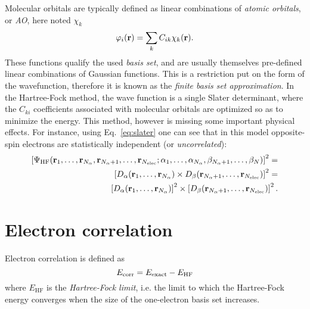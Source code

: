 \documentclass[./thesis.tex]{subfiles}
\begin{document}
Molecular orbitals are typically defined as linear combinations of \emph{atomic orbitals}, or \emph{AO}, here noted $\chi_k$
\begin{equation}
 \varphi_i({\bf r}) = \sum_k C_{ik} \chi_k({\bf r}).
\label{eq:def_mo}
\end{equation}
These functions qualify the used \emph{basis set}, and are usually themselves pre-defined linear combinations of Gaussian functions. This is a restriction put on the form of the wavefunction, therefore it is known as the \emph{finite basis set approximation}.
In the Hartree-Fock method, the wave function is a single Slater determinant, where the $C_{ki}$ coefficients associated with molecular orbitals are optimized so as to minimize the energy.
This method, however is missing some important physical effects. For instance, using Eq.~\eqref{eq:slater} one can see that in this model opposite-spin electrons are statistically independent (or \emph{uncorrelated}):
\begin{equation}
\begin{split}
\left[ \Psi_\textrm{HF}({\bf r}_1,\dots,{\bf r}_{{N_\alpha}},{\bf r}_{{N_\alpha}+1},\dots,{\bf r}_{N_\text{elec}};
      \alpha_1,\dots,\alpha_{{N_\alpha}},\beta_{{N_\alpha}+1},\dots,\beta_N) \right]^2 = \\
\left[ D_\alpha({\bf r}_1,\dots,{\bf r}_{{N_\alpha}}) \times D_\beta({\bf r}_{{N_\alpha}+1},\dots,{\bf r}_{N_\text{elec}}) \right]^2 = \\
\left[ D_\alpha({\bf r}_1,\dots,{\bf r}_{{N_\alpha}}) \right]^2 \times \left[ D_\beta({\bf r}_{{N_\alpha}+1},\dots,{\bf r}_{N_\text{elec}}) \right]^2.
\end{split}
\end{equation}

\section{Electron correlation}

Electron correlation is defined as\cite{Lowdin_1959}
\begin{equation}
E_\text{corr} = E_\text{exact} - E_\text{HF}
\end{equation}
where $E_\text{HF}$ is the \emph{Hartree-Fock limit}, i.e. the limit to which the Hartree-Fock energy converges when the size of the one-electron basis set increases.
\end{document}
